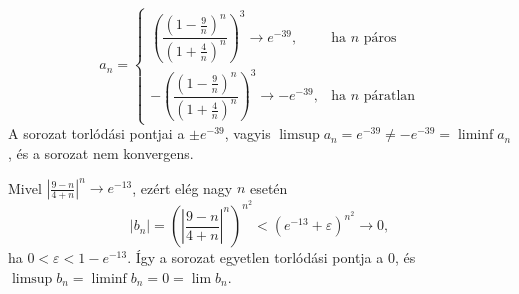 \documentclass[11pt]{scrartcl}
\begin{document}
\[
	a_n = \begin{cases}
		\left(
		\dfrac{\left(1 - \frac{9}{n}\right)^n}{\left(1 + \frac{4}{n}\right)^n}
		\right)^3 \to e^{-39},
		 & \text{ha } n \text{ páros}     \\[3ex]
		-\left(
		\dfrac{\left(1 - \frac{9}{n}\right)^n}{\left(1 + \frac{4}{n}\right)^n}
		\right)^3 \to -e^{-39},
		 & \text{ha } n \text{ páratlan}
	\end{cases}
\]
A sorozat torlódási pontjai a $\pm e^{-39}$, vagyis
$\limsup a_n = e^{-39} \ne -e^{-39} = \liminf a_n$, és a sorozat nem
konvergens.

Mivel
\(
\left| \frac{9 - n}{4 + n} \right|^n \to e^{-13}
\),
ezért elég nagy $n$ esetén
\[
	|b_n|
	= \left( \left| \frac{9 - n}{4 + n} \right|^n \right)^{n^2}
	< \left( e^{-13} + \varepsilon \right)^{n^2}
	\to 0,
\]
ha $0 < \varepsilon < 1 - e^{-13}$. Így a sorozat egyetlen torlódási pontja
a $0$, és $\limsup b_n = \liminf b_n = 0 = \lim b_n$.
\end{document}
